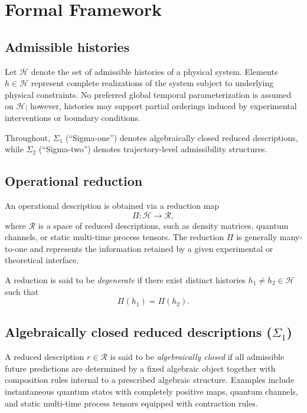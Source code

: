 \section{Formal Framework}
\label{sec:definitions}

\subsection{Admissible histories}

Let $\mathcal{H}$ denote the set of admissible histories of a physical system. Elements
$h \in \mathcal{H}$ represent complete realizations of the system subject to underlying
physical constraints. No preferred global temporal parameterization is assumed on
$\mathcal{H}$; however, histories may support partial orderings induced by experimental
interventions or boundary conditions.

Throughout, $\Sigma_1$ (``Sigma-one'') denotes algebraically closed reduced descriptions, while
$\Sigma_2$ (``Sigma-two'') denotes trajectory-level admissibility structures.

\subsection{Operational reduction}

An operational description is obtained via a reduction map
\begin{equation}
\Pi : \mathcal{H} \rightarrow \mathcal{R},
\end{equation}
where $\mathcal{R}$ is a space of reduced descriptions, such as density matrices, quantum
channels, or static multi-time process tensors. The reduction $\Pi$ is generally many-to-one
and represents the information retained by a given experimental or theoretical interface.

A reduction is said to be \emph{degenerate} if there exist distinct histories
$h_1 \neq h_2 \in \mathcal{H}$ such that
\begin{equation}
\Pi(h_1) = \Pi(h_2).
\end{equation}

\subsection{Algebraically closed reduced descriptions (\texorpdfstring{$\Sigma_1$}{Sigma-1})}

A reduced description $r \in \mathcal{R}$ is said to be \emph{algebraically closed} if all
admissible future predictions are determined by a fixed algebraic object together with
composition rules internal to a prescribed algebraic structure. Examples include
instantaneous quantum states with completely positive maps, quantum channels, and static
multi-time process tensors equipped with contraction rules.

